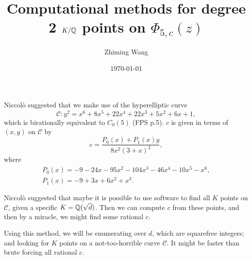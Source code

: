 

\title{Computational methods for degree 2 $K/\mathbb{Q}$ points on
  $\Phi_{5,c}(z)$}
\author{Zhiming Wang}
\date{\today}



\maketitle

Niccol\`o suggested that we make use of the hyperelliptic curve
\[
\mathcal{C}: y^2 = x^6 + 8x^5 + 22x^4 + 22x^3 + 5x^2 + 6x + 1,
\]
which is birationally equivalent to $C_0(5)$ (FPS p.5). $c$ is given
in terms of $(x, y)$ on $\mathcal{C}$ by
\[
c = \frac{P_0(x) + P_1(x) y}{8x^2(3+x)^2},
\]
where
\[
\begin{gathered}
  P_0(x) = -9 - 24x - 95x^2 - 104x^3 - 46x^4 - 10x^5 - x^6,\\
  P_1(x) = -9 + 3x + 6x^2 + x^3.
\end{gathered}
\]

Niccol\`o suggested that maybe it is possible to use software to find
all $K$ points on $\mathcal{C}$, given a specific $K =
\mathbb{Q}(\sqrt{d})$. Then we can compute $c$ from these points, and then by
a miracle, we might find some rational $c$.

Using this method, we will be enumerating over $d$, which are
squarefree integers; and looking for $K$ points on a
not-too-horrible curve $\mathcal{C}$. It might be faster than brute
forcing all rational $c$.


